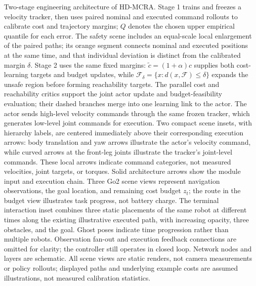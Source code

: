 Two-stage engineering architecture of HD-MCRA.
Stage 1 trains and freezes a velocity tracker, then uses paired nominal and executed command rollouts to calibrate cost and trajectory margins; $Q$ denotes the chosen upper empirical quantile for each error.
The safety scene includes an equal-scale local enlargement of the paired paths; its orange segment connects nominal and executed positions at the same time, and that individual deviation is distinct from the calibrated margin $\delta$.
Stage 2 uses the same fixed margins: $\tilde c=(1+\alpha)c$ supplies both cost-learning targets and budget updates, while $\mathcal F_\delta=\{x:d(x,\mathcal F)\leq\delta\}$ expands the unsafe region before forming reachability targets.
The parallel cost and reachability critics support the joint actor update and budget-feasibility evaluation; their dashed branches merge into one learning link to the actor.
The actor sends high-level velocity commands through the same frozen tracker, which generates low-level joint commands for execution.
Two compact scene insets, with hierarchy labels, are centered immediately above their corresponding execution arrows: body translation and yaw arrows illustrate the actor's velocity command, while curved arrows at the front-leg joints illustrate the tracker's joint-level commands.
These local arrows indicate command categories, not measured velocities, joint targets, or torques.
Solid architecture arrows show the module input and execution chain.
Three Go2 scene views represent navigation observations, the goal location, and remaining cost budget $z_t$; the route in the budget view illustrates task progress, not battery charge.
The terminal interaction inset combines three static placements of the same robot at different times along the existing illustrative executed path, with increasing opacity, three obstacles, and the goal.
Ghost poses indicate time progression rather than multiple robots.
Observation fan-out and execution feedback connections are omitted for clarity; the controller still operates in closed loop.
Network nodes and layers are schematic.
All scene views are static renders, not camera measurements or policy rollouts; displayed paths and underlying example costs are assumed illustrations, not measured calibration statistics.
